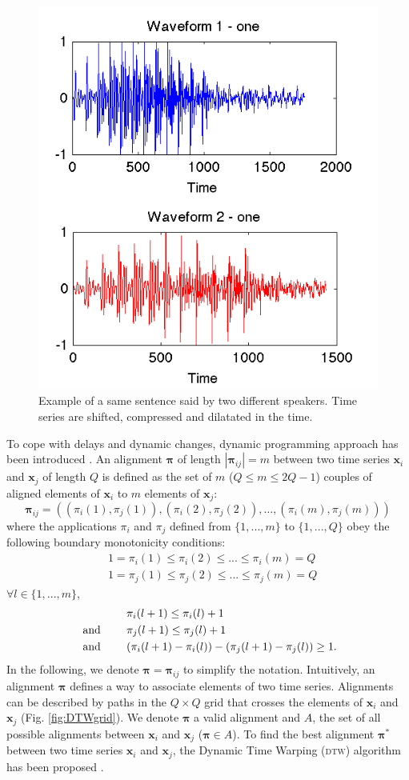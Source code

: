 \begin{figure}[h!]
\centering
\includegraphics[width=0.5\linewidth]{images/Voice_Example}
\caption{Example of a same sentence said by two different speakers. Time series are shifted, compressed and dilatated in the time.}
\label{fig:Voice_Example}
\end{figure}
To cope with delays and dynamic changes, dynamic programming approach has been introduced \cite{Berndt1994a}. An alignment $\boldsymbol{\pi}$ of length $|\boldsymbol{\pi}_{ij}|=m$ between two time series $\textbf{x}_i$ and $\textbf{x}_j$ of length $Q$ is defined as the set of $m$ ($Q \leq m \leq 2Q-1$) couples of aligned elements of $\textbf{x}_i$ to $m$ elements of $\textbf{x}_j$:
\begin{equation}
\boldsymbol{\pi}_{ij} = 
\left(  
(\pi_i(1),\pi_j(1)), 
(\pi_i(2),\pi_j(2)), 
\ldots,
(\pi_i(m),\pi_j(m))
\right) 
\end{equation}
\noindent where the applications $\pi_i$ and $\pi_j$ defined from $\{1, ..., m\}$ to $\{1, ..., Q\}$ obey the following boundary monotonicity conditions: 
\begin{align}
& 1 = \pi_i(1) \leq \pi_i(2) \leq ... \leq \pi_i(m) = Q \\
& 1 = \pi_j(1) \leq \pi_j(2) \leq ... \leq \pi_j(m) = Q 
\end{align}
$\forall l \in \{1, ..., m\}$, 
\begin{align}
& \pi_i(l+1) \leq \pi_i(l)+1 \\
\text{  and  \qquad} & \pi_j(l+1) \leq \pi_j(l)+1 \\
\text{  and  \qquad} & ( \pi_i(l+1)-\pi_i(l) ) - ( \pi_j(l+1)-\pi_j(l)) \geq 1 . 
\end{align}
In the following, we denote $\boldsymbol{\pi}=\boldsymbol{\pi}_{ij}$ to simplify the notation. Intuitively, an alignment $\boldsymbol{\pi}$ defines a way to associate elements of two time series. Alignments can be described by paths in the $Q \times Q$ grid that crosses the elements of $\textbf{x}_i$ and $\textbf{x}_j$ (Fig. \ref{fig:DTWgrid}). We denote $\boldsymbol{\pi}$ a valid alignment and $A$, the set of all possible alignments between $\textbf{x}_i$ and $\textbf{x}_j$ ($\boldsymbol{\pi} \in A$). To find the best alignment $\boldsymbol{\pi}^*$ between two time series $\textbf{x}_i$ and $\textbf{x}_j$, the Dynamic Time Warping (\textsc{dtw}) algorithm has been proposed \cite{Keogh2004,Salvador}.

